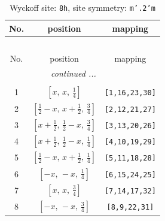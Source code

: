 \documentclass[fleqn,8pt]{jsarticle}
\begin{document}
\begin{longtable}{ccc}
\caption{Wyckoff site: {\tt 8h}, site symmetry: {\tt m'.2'm}}
 \\
 \hline \hline
No. & position & mapping \\ \hline \endfirsthead

\multicolumn{2}{l}{\tablename\ \thetable{}} \\
 \hline \hline
No. & position & mapping \\ \hline \endhead

 \hline \hline
\multicolumn{2}{r}{\footnotesize\it continued ...} \\ \endfoot

 \hline \hline
\multicolumn{2}{r}{} \\ \endlastfoot

1 & $\left[ x,\, x,\, \frac{1}{4} \right]$ & {\tt [1,16,23,30]} \\ \hline
2 & $\left[ \frac{1}{2} - x,\, x + \frac{1}{2},\, \frac{3}{4} \right]$ & {\tt [2,12,21,27]} \\ \hline
3 & $\left[ x + \frac{1}{2},\, \frac{1}{2} - x,\, \frac{3}{4} \right]$ & {\tt [3,13,20,26]} \\ \hline
4 & $\left[ x + \frac{1}{2},\, \frac{1}{2} - x,\, \frac{1}{4} \right]$ & {\tt [4,10,19,29]} \\ \hline
5 & $\left[ \frac{1}{2} - x,\, x + \frac{1}{2},\, \frac{1}{4} \right]$ & {\tt [5,11,18,28]} \\ \hline
6 & $\left[ - x,\, - x,\, \frac{1}{4} \right]$ & {\tt [6,15,24,25]} \\ \hline
7 & $\left[ x,\, x,\, \frac{3}{4} \right]$ & {\tt [7,14,17,32]} \\ \hline
8 & $\left[ - x,\, - x,\, \frac{3}{4} \right]$ & {\tt [8,9,22,31]} \\
\end{longtable}
\renewcommand{\arraystretch}{1.2}
\end{document}
